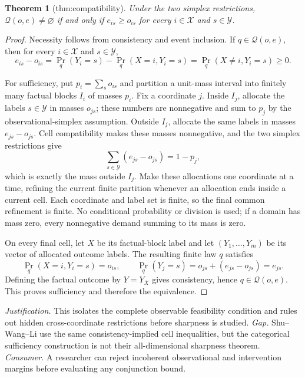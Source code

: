 \documentclass{article}
\newtheorem{theorem}{Theorem}
\begin{document}
\begin{theorem}[thm:compatibility]\label{thm:compatibility}
Under the two simplex restrictions, \(\mathcal Q(o,e)\neq\varnothing\) if and only if \(e_{is}\geq o_{is}\) for every \(i\in\mathcal X\) and \(s\in\mathcal Y\).
\end{theorem}
\begin{proof}
Necessity follows from consistency and event inclusion.  If \(q\in\mathcal Q(o,e)\), then for every \(i\in\mathcal X\) and \(s\in\mathcal Y\),
\[
 e_{is}-o_{is}
 =\Pr_q(Y_i=s)-\Pr_q(X=i,Y_i=s)
 =\Pr_q(X\ne i,Y_i=s)\geq0.
\]

For sufficiency, put \(p_i=\sum_s o_{is}\) and partition a unit-mass interval into finitely many factual blocks \(I_i\) of masses \(p_i\).  Fix a coordinate \(j\).  Inside \(I_j\), allocate the labels \(s\in\mathcal Y\) in masses \(o_{js}\); these numbers are nonnegative and sum to \(p_j\) by the observational-simplex assumption.  Outside \(I_j\), allocate the same labels in masses \(e_{js}-o_{js}\).  Cell compatibility makes these masses nonnegative, and the two simplex restrictions give
\[
 \sum_{s\in\mathcal Y}(e_{js}-o_{js})=1-p_j,
\]
which is exactly the mass outside \(I_j\).  Make these allocations one coordinate at a time, refining the current finite partition whenever an allocation ends inside a current cell.  Each coordinate and label set is finite, so the final common refinement is finite.  No conditional probability or division is used; if a domain has mass zero, every nonnegative demand summing to its mass is zero.

On every final cell, let \(X\) be its factual-block label and let \((Y_1,\ldots,Y_m)\) be its vector of allocated outcome labels.  The resulting finite law \(q\) satisfies
\[
 \Pr_q(X=i,Y_i=s)=o_{is},\qquad
 \Pr_q(Y_j=s)=o_{js}+(e_{js}-o_{js})=e_{js}.
\]
Defining the factual outcome by \(Y=Y_X\) gives consistency, hence \(q\in\mathcal Q(o,e)\).  This proves sufficiency and therefore the equivalence.
\end{proof}
\par\smallskip\noindent \textit{Justification.} This isolates the complete observable feasibility condition and rules out hidden cross-coordinate restrictions before sharpness is studied. \textit{Gap.} Shu--Wang--Li use the same consistency-implied cell inequalities, but the categorical sufficiency construction is not their all-dimensional sharpness theorem. \textit{Consumer.} A researcher can reject incoherent observational and intervention margins before evaluating any conjunction bound.
\end{document}
